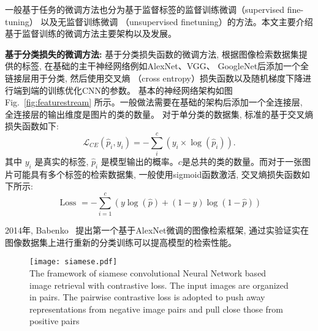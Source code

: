 一般基于任务的微调方法也分为基于监督标签的监督训练微调（supervised fine-tuning） 以及无监督训练微调 （unsupervised finetuning）的方法。本文主要介绍基于监督训练的微调方法主要架构以及发展。\par
\textbf{基于分类损失的微调方法:} 基于分类损失函数的微调方法, 根据图像检索数据集提供的标签, 在基础的主干神经网络例如AlexNet、VGG、 GoogleNet后添加一个全链接层用于分类, 然后使用交叉熵 （cross entropy）损失函数以及随机梯度下降进行端到端的训练优化CNN的参数。 基本的神经网络架构如图Fig.~\ref{fig:featurestream} 所示。一般做法需要在基础的架构后添加一个全连接层, 全连接层的输出维度是图片的类的数量。 对于单分类的数据集, 标准的基于交叉熵损失函数如下:
\begin{equation}
    \mathcal{L}_{C E}\left(\hat{p}_i, y_i\right)=-\sum_i^c\left(y_i \times \log \left(\hat{p}_i\right)\right).
\end{equation}
其中 $y_i$ 是真实的标签, $\hat{p}_i$ 是模型输出的概率。$c$是总共的类的数量。而对于一张图片可能具有多个标签的检索数据集, 一般使用sigmoid函数激活, 交叉熵损失函数如下所示:
\begin{equation}
    \text { Loss }=-\sum_{i=1}^c(y \log (\hat{p})+(1-y) \log (1-\hat{p}))
    \label{eq:ce}
\end{equation} \par
2014年, Babenko~\cite{babenko2014neural} 提出第一个基于AlexNet微调的图像检索框架, 通过实验证实在图像数据集上进行重新的分类训练可以提高模型的检索性能。 \par

\begin{figure}[!htp]
    \centering
    \texttt{[image: siamese.pdf]} \\
      {The framework of siamese convolutional Neural Network based image retrieval with contrastive loss. The input images are organized in pairs. The pairwise contrastive loss is adopted to push away representations from negative image pairs and pull close those from positive pairs }
   \label{fig:siamese}
\end{figure}

